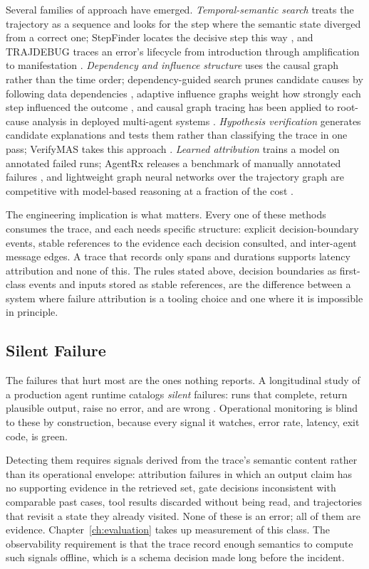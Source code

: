 \documentclass[11pt]{book}
\begin{document}
Several families of approach have emerged. \textit{Temporal-semantic search} treats the trajectory as a sequence and looks for the step where the semantic state diverged from a correct one; StepFinder locates the decisive step this way \cite{stepfinder2026}, and TRAJDEBUG traces an error's lifecycle from introduction through amplification to manifestation \cite{trajdebug2026}. \textit{Dependency and influence structure} uses the causal graph rather than the time order; dependency-guided search prunes candidate causes by following data dependencies \cite{falat2026}, adaptive influence graphs weight how strongly each step influenced the outcome \cite{influencegraph2026}, and causal graph tracing has been applied to root-cause analysis in deployed multi-agent systems \cite{agenttracecausal2026}. \textit{Hypothesis verification} generates candidate explanations and tests them rather than classifying the trace in one pass; VerifyMAS takes this approach \cite{verifymas2026}. \textit{Learned attribution} trains a model on annotated failed runs; AgentRx releases a benchmark of manually annotated failures \cite{agentrx2026}, and lightweight graph neural networks over the trajectory graph are competitive with model-based reasoning at a fraction of the cost \cite{gnnattrib2026}.

The engineering implication is what matters. Every one of these methods consumes the trace, and each needs specific structure: explicit decision-boundary events, stable references to the evidence each decision consulted, and inter-agent message edges. A trace that records only spans and durations supports latency attribution and none of this. The rules stated above, decision boundaries as first-class events and inputs stored as stable references, are the difference between a system where failure attribution is a tooling choice and one where it is impossible in principle.

\subsection{Silent Failure}

The failures that hurt most are the ones nothing reports. A longitudinal study of a production agent runtime catalogs \textit{silent} failures: runs that complete, return plausible output, raise no error, and are wrong \cite{silentfail2026}. Operational monitoring is blind to these by construction, because every signal it watches, error rate, latency, exit code, is green.

Detecting them requires signals derived from the trace's semantic content rather than its operational envelope: attribution failures in which an output claim has no supporting evidence in the retrieved set, gate decisions inconsistent with comparable past cases, tool results discarded without being read, and trajectories that revisit a state they already visited. None of these is an error; all of them are evidence. Chapter~\ref{ch:evaluation} takes up measurement of this class. The observability requirement is that the trace record enough semantics to compute such signals offline, which is a schema decision made long before the incident.
\end{document}
